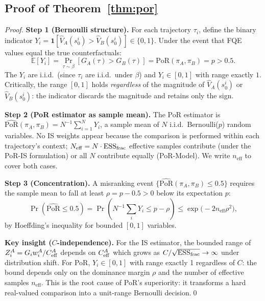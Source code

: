 \documentclass[10pt]{article}
\theoremstyle{plain}
\theoremstyle{definition}
\theoremstyle{remark}
\newcommand{\E}{\mathbb{E}}
\newcommand{\PoR}{\mathrm{PoR}}
\newcommand{\ESS}{\mathrm{ESS}}
\newcommand{\neff}{n_{\mathrm{eff}}}
\newcommand{\piA}{\pi_A}
\newcommand{\piB}{\pi_B}
\newcommand{\GA}{G_A}
\newcommand{\GB}{G_B}
\begin{document}
\subsection{Proof of Theorem~\ref{thm:por}}
\label{app:proof_thm3}

\begin{proof}
\textbf{Step 1 (Bernoulli structure).}
For each trajectory $\tau_i$, define the binary indicator
$Y_i=\mathbf{1}[\hat{V}_A(s_0^i)>\hat{V}_B(s_0^i)]\in\{0,1\}$.  Under
the event that FQE values equal the true counterfactuals:
\begin{equation}
  \E[Y_i] = \Pr_{\tau\sim\beta}[\GA(\tau)>\GB(\tau)] = \PoR(\piA,\piB) = p > 0.5.
\end{equation}
The $Y_i$ are i.i.d.\ (since $\tau_i$ are i.i.d.\ under $\beta$) and
$Y_i\in[0,1]$ with range exactly $1$.  Critically, the range $[0,1]$ holds
\emph{regardless} of the magnitude of $\hat{V}_A(s_0^i)$ or $\hat{V}_B(s_0^i)$:
the indicator discards the magnitude and retains only the sign.

\textbf{Step 2 (PoR estimator as sample mean).}
The PoR estimator is $\widehat{\PoR}(\piA,\piB)=N^{-1}\sum_{i=1}^N Y_i$,
a sample mean of $N$ i.i.d.\ Bernoulli($p$) random variables.  No IS
weights appear because the comparison is performed within each trajectory's
context; $N_{\rm eff}=N\cdot\ESS_{\rm frac}$ effective samples contribute
(under the PoR-IS formulation) or all $N$ contribute equally (PoR-Model).
We write $\neff$ to cover both cases.

\textbf{Step 3 (Concentration).}
A misranking event $\{\widehat{\PoR}(\piA,\piB)\leq 0.5\}$ requires the
sample mean to fall at least $\rho=p-0.5>0$ below its expectation $p$:
\begin{equation}
  \Pr\!\left(\widehat{\PoR}\leq 0.5\right)
  = \Pr\!\left(N^{-1}\textstyle\sum_i Y_i\leq p-\rho\right)
  \leq \exp\!\bigl(-2\neff\rho^2\bigr),
\end{equation}
by Hoeffding's inequality for bounded $[0,1]$ variables.

\textbf{Key insight ($C$-independence).}  For the IS estimator, the
bounded range of $Z_i^A=G_i w_i^A/C_{\rm eff}^A$ depends on $C_{\rm eff}^A$
which grows as $C/\sqrt{\ESS_{\rm frac}}\to\infty$ under distribution shift.
For PoR, $Y_i\in[0,1]$ with range exactly 1 regardless of $C$: the bound
depends only on the dominance margin $\rho$ and the number of effective
samples $\neff$.  This is the root cause of PoR's superiority: it transforms
a hard real-valued comparison into a unit-range Bernoulli decision.\qed
\end{proof}
\end{document}
